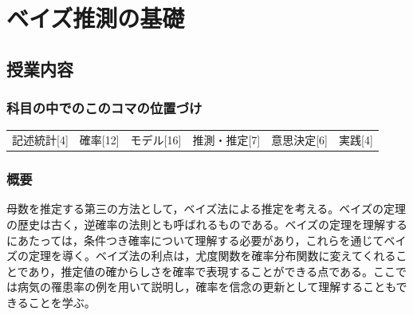 \section{ベイズ推測の基礎}
\label{D1_lesson25}
\subsection{授業内容}
\subsubsection{科目の中でのこのコマの位置づけ}
\begin{tabular}[t]{cccccc}
    記述統計[4] & 確率[12] & モデル[16] & 推測・推定[7] & 意思決定[6] & 実践[4]
\end{tabular}
\subsubsection{概要}
母数を推定する第三の方法として，ベイズ法による推定を考える。ベイズの定理の歴史は古く，逆確率の法則とも呼ばれるものである。ベイズの定理を理解するにあたっては，条件つき確率について理解する必要があり，これらを通じてベイズの定理を導く。ベイズ法の利点は，尤度関数を確率分布関数に変えてくれることであり，推定値の確からしさを確率で表現することができる点である。ここでは病気の罹患率の例を用いて説明し，確率を信念の更新として理解することもできることを学ぶ。
